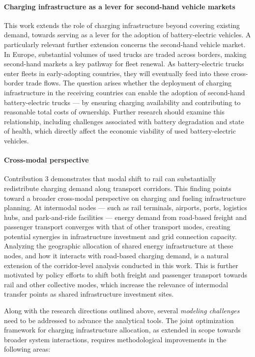 \paragraph*{Charging infrastructure as a lever for second-hand vehicle markets}
This work extends the role of charging infrastructure beyond covering existing demand, towards serving as a lever for the adoption of battery-electric vehicles. A particularly relevant further extension concerns the second-hand vehicle market. In Europe, substantial volumes of used trucks are traded across borders, making second-hand markets a key pathway for fleet renewal. As battery-electric trucks enter fleets in early-adopting countries, they will eventually feed into these cross-border trade flows. The question arises whether the deployment of charging infrastructure in the receiving countries can enable the adoption of second-hand battery-electric trucks — by ensuring charging availability and contributing to reasonable total costs of ownership. Further research should examine this relationship, including challenges associated with battery degradation and state of health, which directly affect the economic viability of used battery-electric vehicles.

\paragraph*{Cross-modal perspective}
Contribution 3 demonstrates that modal shift to rail can substantially redistribute charging demand along transport corridors. This finding points toward a broader cross-modal perspective on charging and fueling infrastructure planning. At intermodal nodes — such as rail terminals, airports, ports, logistics hubs, and park-and-ride facilities — energy demand from road-based freight and passenger transport converges with that of other transport modes, creating potential synergies in infrastructure investment and grid connection capacity. Analyzing the geographic allocation of shared energy infrastructure at these nodes, and how it interacts with road-based charging demand, is a natural extension of the corridor-level analysis conducted in this work. This is further motivated by policy efforts to shift both freight and passenger transport towards rail and other collective modes, which increase the relevance of intermodal transfer points as shared infrastructure investment sites.

Along with the research directions outlined above, several \textit{modeling challenges} need to be addressed to advance the analytical tools. The joint optimization framework for charging infrastructure allocation, as extended in scope towards broader system interactions, requires methodological improvements in the following areas:

